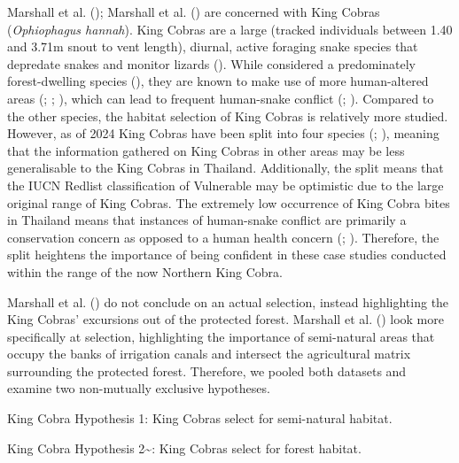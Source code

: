 \documentclass[10pt,a4paper]{article}
\begin{document}
Marshall et al. (); Marshall et al. () are concerned with King Cobras (\emph{Ophiophagus hannah}).
King Cobras are a large (tracked individuals between 1.40 and 3.71m snout to vent length), diurnal, active foraging snake species that depredate snakes and monitor lizards ().
While considered a predominately forest-dwelling species (), they are known to make use of more human-altered areas (; ; ), which can lead to frequent human-snake conflict (; ).
Compared to the other species, the habitat selection of King Cobras is relatively more studied.
However, as of 2024 King Cobras have been split into four species (; ), meaning that the information gathered on King Cobras in other areas may be less generalisable to the King Cobras in Thailand.
Additionally, the split means that the IUCN Redlist classification of Vulnerable may be optimistic due to the large original range of King Cobras.
The extremely low occurrence of King Cobra bites in Thailand means that instances of human-snake conflict are primarily a conservation concern as opposed to a human health concern (; ).
Therefore, the split heightens the importance of being confident in these case studies conducted within the range of the now Northern King Cobra.

Marshall et al. () do not conclude on an actual selection, instead highlighting the King Cobras' excursions out of the protected forest.
Marshall et al. () look more specifically at selection, highlighting the importance of semi-natural areas that occupy the banks of irrigation canals and intersect the agricultural matrix surrounding the protected forest.
Therefore, we pooled both datasets and examine two non-mutually exclusive hypotheses.

King Cobra Hypothesis 1: King Cobras select for semi-natural habitat.

King Cobra Hypothesis 2\textasciitilde: King Cobras select for forest habitat.
\end{document}

